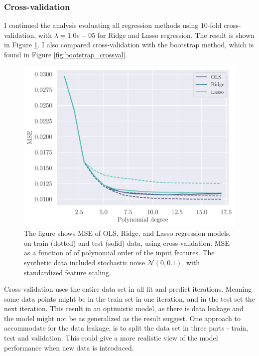 \subsubsection{Cross-validation}\label{sssec:cross_validation_synthetic}
I continued the analysis evaluating all regression methods using $10$-fold cross-validation, with $\lambda = 1.0e-05$ for Ridge and Lasso regression. The result is shown in Figure \ref{fig:crossval}. I also compared cross-validation with the bootstrap method, which is found in Figure \ref{fig:bootstrap_crossval}.
\begin{figure}[h]
    \centering
    \includegraphics[width=\linewidth]{project-1/latex/figures/ols_crossval_10_N50.pdf}
    \caption{The figure shows MSE of OLS, Ridge, and Lasso regression models, on train (dotted) and test (solid) data, using cross-validation. MSE as a function of of polynomial order of the input features. The synthetic data included stochastic noise $\mathcal{N}(0, 0.1)$, with standardized feature scaling.}
    \label{fig:crossval}
\end{figure}
Cross-validation uses the entire data set in all fit and predict iterations. Meaning some data points might be in the train set in one iteration, and in the test set the next iteration. This result in an optimistic model, as there is data leakage and the model might not be as generalized as the result suggest. One approach to accommodate for the data leakage, is to split the data set in three parts - train, test and validation. This could give a more realistic view of the model performance when new data is introduced. 

